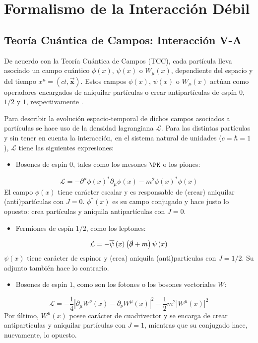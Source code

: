 \section{Formalismo de la Interacción Débil}\label{cap:formalism}
\subsection{Teoría Cuántica de Campos: Interacción V-A}\label{sec:QFT}
De acuerdo con la Teoría Cuántica de Campos (TCC), cada partícula lleva asociado un campo cuántico $\phi(x)$, $\psi(x)$ o $W_{\mu}(x)$, dependiente del espacio y del tiempo $x^{\mu}=(ct,\boldsymbol{\vec{x}})$\protect\footnotemark. Estos campos $\phi(x)$, $\psi(x)$ o $W_{\mu}(x)$ actúan como operadores encargados de aniquilar partículas o crear antipartículas de espín $0$, $1/2 $ y $1$, respectivamente \cite{notas2020}.

 
Para describir la evolución espacio-temporal de dichos campos asociados a partículas se hace uso de la densidad lagrangiana $\mathcal{L}$. Para las distintas partículas y sin tener en cuenta la interacción, en el sistema natural de unidades ($c=\hbar =1$), $\mathcal{L}$ tiene las siguientes expresiones:
\begin{itemize}
\item Bosones de espín $0$, tales como los mesones $\PK$ o los piones:
\end{itemize}
\begin{equation}
\mathcal{L}=-\partial ^{\mu }\phi \left( x\right) ^{\ast }\partial_{\mu} \phi \left( x\right) -m^{2}\phi \left( x\right) ^{\ast }\phi \left( x\right)
\end{equation}
El campo $\phi(x)$ tiene carácter escalar y es responsable de (crear) aniquilar (anti)partículas con $J=0$. $\phi^{\ast}(x)$ es su campo conjugado y hace justo lo opuesto: crea partículas y aniquila antipartículas con $J=0$.
\begin{itemize}
\item Fermiones de espín $1/2$, como los leptones:
\end{itemize}
\begin{equation}
\mathcal{L}=-\overline{\psi }\left( x\right) \left( \slashed{\partial}+m\right) \psi \left( x\right)
\end{equation}
$\psi(x)$ tiene carácter de espinor y (crea) aniquila (anti)partículas con $J=1/2$. Su adjunto también hace lo contrario.
\begin{itemize}
\item Bosones de espín $1$, como son los fotones o los bosones vectoriales $W$:
\end{itemize}
\begin{equation}
\mathcal{L}=-\dfrac{1}{4}\left| \partial _{\mu }W^{\nu }\left( x\right) -\partial _{\nu }W^{\mu }\left( x\right) \right| ^{2}-\dfrac{1}{2}m^{2}\left| W^{\mu }\left( x\right) \right| ^{2}
\end{equation}
Por último, $W^{\mu}(x)$ posee carácter de cuadrivector y se encarga de crear antipartículas y aniquilar partículas con $J=1$, mientras que su conjugado hace, nuevamente, lo opuesto.

